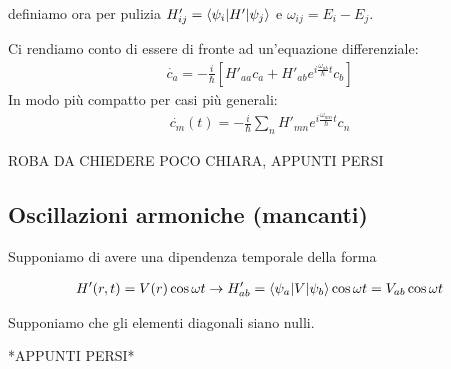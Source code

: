 definiamo ora per pulizia $H'_{ij} = \braket{\psi_i|H'|\psi_j}$ e $\omega_{ij}=E_i - E_j$. 

Ci rendiamo conto di essere di fronte ad un'equazione differenziale:
\begin{align}
\dot{c_a} = -\frac{i}{\hbar}[H'_{aa} c_a + H'_{ab} e^{i\frac{\omega_{ab}}{\hbar}t} c_b]
\end{align}
In modo più compatto per casi più generali:
\begin{align}
\dot{c_m}(t)= -\frac{i}{\hbar}\sum_n H'_{mn} e^{i\frac{\omega_{mn}}{\hbar}t}c_n
\end{align}

ROBA DA CHIEDERE POCO CHIARA, APPUNTI PERSI

\subsection{Oscillazioni armoniche (mancanti)}

Supponiamo di avere una dipendenza temporale della forma

\begin{align}
H'(r,t)= V(r) \cos{\omega t} \rightarrow H'_{ab}= \braket{\psi_a|V|\psi_b} \cos{\omega t} = V_{ab}\cos{\omega t}
\end{align}

Supponiamo che gli elementi diagonali siano nulli.

*APPUNTI PERSI*